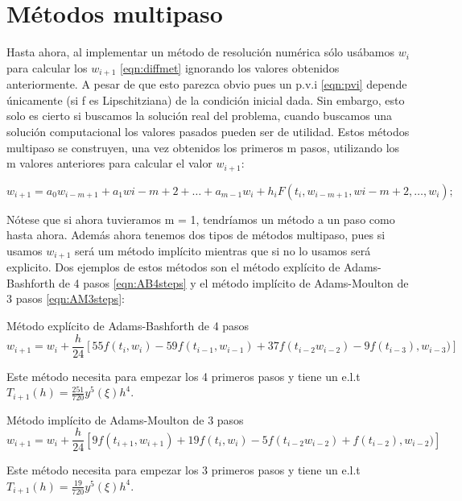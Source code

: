 \section{Métodos multipaso}
Hasta ahora, al implementar un método de resolución numérica sólo usábamos 
$w_i$ para calcular los $w_{i+1}$ \ref{eqn:diffmet} ignorando los valores obtenidos 
anteriormente. A pesar de que esto parezca obvio pues un p.v.i \ref{eqn:pvi} 
depende únicamente (si f es Lipschitziana) de la condición inicial dada. 
Sin embargo, esto solo es cierto si buscamos la solución real del problema, 
cuando buscamos una solución computacional los valores pasados pueden ser de utilidad.
Estos métodos multipaso se construyen, una vez obtenidos los primeros m pasos, 
utilizando los m valores anteriores para calcular el valor $w_{i+1}$:

\begin{equation} \label{eqn:multistep}
w_{i+1} = a_0w_{i-m+1} + a_1w{i-m+2} + \dots + a_{m-1}w_i + h_iF(t_i,w_{i-m+1},w{i-m+2},\dots,w_i);
\end{equation}

Nótese que si ahora tuvieramos m = 1, tendríamos un método a un paso como hasta ahora. 
Además ahora tenemos dos tipos de métodos multipaso, pues si usamos $w_{i+1}$ 
será um método implícito mientras que si no lo usamos será explicito.
Dos ejemplos de estos métodos son el método explícito de Adams-Bashforth 
de 4 pasos \ref{eqn:AB4steps} y el método implícito de Adams-Moulton de 
3 pasos \ref{eqn:AM3steps}:%

\begin{method} 
    Método explícito de Adams-Bashforth de 4 pasos
    \begin{equation} \label{eqn:AB4steps}
        w_{i+1} = w_i + \frac{h}{24}[
                            55f(t_i,w_i) - 59f(t_{i-1},w_{i-1}) + 37f(t_{i-2}w_{i-2}) - 9f(t_{i-3}),w_{i-3})
                        ]
    \end{equation}
\end{method}
    
Este método necesita para empezar los 4 primeros pasos y 
tiene un e.l.t $T_{i+1}(h) = \frac{251}{720}y^5(\xi)h^4$. %


\begin{method} 
    Método implícito de Adams-Moulton de 3 pasos
    \begin{equation} \label{eqn:AM3steps}
        w_{i+1} = w_i + \frac{h}{24}[
            9f(t_{i+1},w_{i+1}) + 19f(t_i,w_i) - 5f(t_{i-2}w_{i-2}) + f(t_{i-2}),w_{i-2})
            ]
    \end{equation}   
\end{method}
Este método necesita para empezar los 3 primeros pasos y 
tiene un e.l.t $T_{i+1}(h) = \frac{19}{720}y^5(\xi)h^4$. %

